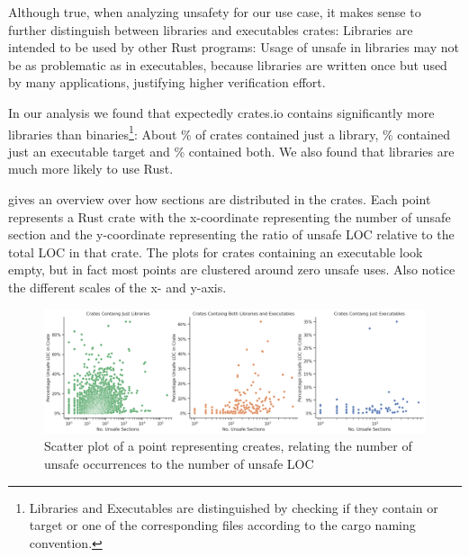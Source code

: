 \documentclass[twoside, english, final]{sdqthesis}
\theoremstyle{definition}
\begin{document}
Although true, when analyzing unsafety for our use case, it makes sense to further distinguish between libraries and executables crates: Libraries are intended to be used by other Rust programs: Usage of unsafe in libraries may not be as problematic as in executables, because libraries are written once but used by many applications, justifying higher verification effort. 

In our analysis we found that expectedly crates.io contains significantly more libraries than binaries\footnote{Libraries and Executables are distinguished by checking if they contain  or  target or one of the corresponding files according to the cargo naming convention.}: About \% of crates contained just a library, \% contained just an executable target and \% contained both. 
We also found that libraries are much more likely to use  Rust.


 gives an overview over how  sections are distributed in the crates. Each point represents a Rust crate with the x-coordinate representing the number of unsafe section and the y-coordinate representing the ratio of unsafe LOC relative to the total LOC in that crate. The plots for crates containing an executable look empty, but in fact most points are clustered around zero unsafe uses. Also notice the different scales of the x- and y-axis.

\begin{figure}[h]
	\centering
	\includegraphics[width=0.99\linewidth, clip, trim={0.2cm 0.2cm 0.2cm 0.2cm}]{../scatter-occurences-vs-loc.png}
	\caption{Scatter plot of a point representing creates, relating the number of unsafe occurrences to the number of unsafe LOC}
	\label{fig:unsafe-scatter}
\end{figure}
\end{document}
